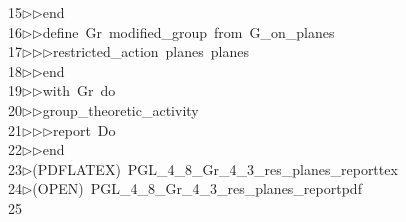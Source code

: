\begin{tabbing}
15\>$\triangleright$\>$\triangleright$\>end\ \\[0pt]
16\>$\triangleright$\>$\triangleright$\>define\ Gr\ modified\_group\ from\ G\_on\_planes\ \\[0pt]
17\>$\triangleright$\>$\triangleright$\>$\triangleright$\>restricted\_action\ planes\ planes\ \\[0pt]
18\>$\triangleright$\>$\triangleright$\>end\ \\[0pt]
19\>$\triangleright$\>$\triangleright$\>with\ Gr\ do\ \\[0pt]
20\>$\triangleright$\>$\triangleright$\>group\_theoretic\_activity\ \\[0pt]
21\>$\triangleright$\>$\triangleright$\>$\triangleright$\>report\ Do\ \\[0pt]
22\>$\triangleright$\>$\triangleright$\>end\\[0pt]
23\>$\triangleright$\>(PDFLATEX)\ PGL\_4\_8\_Gr\_4\_3\_res\_planes\_reporttex\\[0pt]
24\>$\triangleright$\>(OPEN)\ PGL\_4\_8\_Gr\_4\_3\_res\_planes\_reportpdf\\[0pt]
25\>\end{tabbing}
